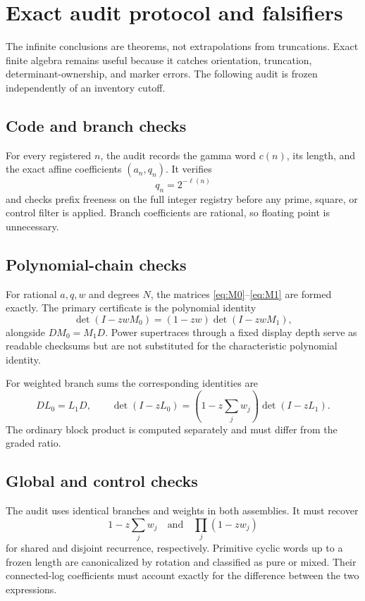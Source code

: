 \section{Exact audit protocol and falsifiers}
\label{sec:audit}

The infinite conclusions are theorems, not extrapolations from truncations.
Exact finite algebra remains useful because it catches orientation,
truncation, determinant-ownership, and marker errors.  The following audit
is frozen independently of an inventory cutoff.

\subsection{Code and branch checks}

For every registered \(n\), the audit records the gamma word \(c(n)\), its
length, and the exact affine coefficients \((a_n,q_n)\).  It verifies
\[
        q_n=2^{-\ell(n)}
\]
and checks prefix freeness on the full integer registry before any prime,
square, or control filter is applied.  Branch coefficients are rational, so
floating point is unnecessary.

\subsection{Polynomial-chain checks}

For rational \(a,q,w\) and degrees \(N\), the matrices
\eqref{eq:M0}--\eqref{eq:M1} are formed exactly.  The primary certificate is
the polynomial identity
\[
 \det(I-zwM_0)=(1-zw)\det(I-zwM_1),
\]
alongside \(DM_0=M_1D\).  Power supertraces through a fixed display depth
serve as readable checksums but are not substituted for the characteristic
polynomial identity.

For weighted branch sums the corresponding identities are
\[
 DL_0=L_1D,
 \qquad
 \det(I-zL_0)=\left(1-z\sum_jw_j\right)\det(I-zL_1).
\]
The ordinary block product is computed separately and must differ from the
graded ratio.

\subsection{Global and control checks}

The audit uses identical branches and weights in both assemblies.  It must
recover
\[
 1-z\sum_jw_j
 \quad\text{and}\quad
 \prod_j(1-zw_j)
\]
for shared and disjoint recurrence, respectively.  Primitive cyclic words
up to a frozen length are canonicalized by rotation and classified as pure
or mixed.  Their connected-log coefficients must account exactly for the
difference between the two expressions.

